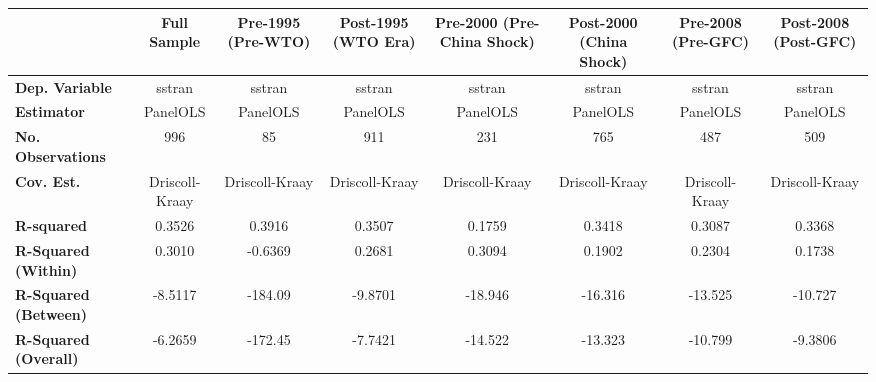 \begin{center}
\begin{tabular}{lccccccc}
\toprule
                                   & \textbf{Full Sample} & \textbf{Pre-1995 (Pre-WTO)} & \textbf{Post-1995 (WTO Era)} & \textbf{Pre-2000 (Pre-China Shock)} & \textbf{Post-2000 (China Shock)} & \textbf{Pre-2008 (Pre-GFC)} & \textbf{Post-2008 (Post-GFC)}  \\
\midrule
\textbf{Dep. Variable}             &        sstran        &            sstran           &            sstran            &                sstran               &              sstran              &            sstran           &             sstran             \\
\textbf{Estimator}                 &       PanelOLS       &           PanelOLS          &           PanelOLS           &               PanelOLS              &             PanelOLS             &           PanelOLS          &            PanelOLS            \\
\textbf{No. Observations}          &         996          &              85             &             911              &                 231                 &               765                &             487             &              509               \\
\textbf{Cov. Est.}                 &    Driscoll-Kraay    &        Driscoll-Kraay       &        Driscoll-Kraay        &            Driscoll-Kraay           &          Driscoll-Kraay          &        Driscoll-Kraay       &         Driscoll-Kraay         \\
\textbf{R-squared}                 &        0.3526        &            0.3916           &            0.3507            &                0.1759               &              0.3418              &            0.3087           &             0.3368             \\
\textbf{R-Squared (Within)}        &        0.3010        &           -0.6369           &            0.2681            &                0.3094               &              0.1902              &            0.2304           &             0.1738             \\
\textbf{R-Squared (Between)}       &       -8.5117        &           -184.09           &           -9.8701            &               -18.946               &             -16.316              &           -13.525           &            -10.727             \\
\textbf{R-Squared (Overall)}       &       -6.2659        &           -172.45           &           -7.7421            &               -14.522               &             -13.323              &           -10.799           &            -9.3806             \\

\end{tabular}
\end{center}
